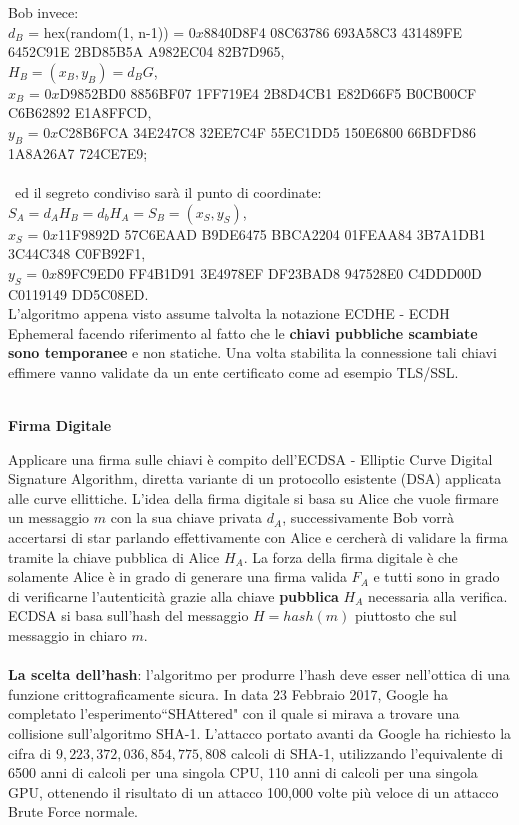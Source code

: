 \documentclass[a4paper,12pt]{tesiinfo}
\begin{document}
Bob invece:\\
$d_B$ = hex(random(1, n-1)) = $0x$8840D8F4 08C63786 693A58C3 431489FE 6452C91E 2BD85B5A A982EC04 82B7D965,\\
$H_B = (x_B, y_B) = d_BG$,\\
$x_B$ = $0x$D9852BD0 8856BF07 1FF719E4 2B8D4CB1 E82D66F5 B0CB00CF C6B62892 E1A8FFCD,\\
$y_B$ = $0x$C28B6FCA 34E247C8 32EE7C4F 55EC1DD5 150E6800 66BDFD86 1A8A26A7 724CE7E9;\\
\\\
ed il segreto condiviso sar\`a il punto di coordinate:\\
$S_A = d_AH_B = d_bH_A = S_B = (x_S, y_S)$,\\
$x_S$ = $0x$11F9892D 57C6EAAD B9DE6475 BBCA2204 01FEAA84 3B7A1DB1 3C44C348 C0FB92F1,\\
$y_S$ = $0x$89FC9ED0 FF4B1D91 3E4978EF DF23BAD8 947528E0 C4DDD00D C0119149 DD5C08ED.
\\
L'algoritmo appena visto assume talvolta la notazione ECDHE - ECDH Ephemeral facendo riferimento al fatto che le \textbf{chiavi pubbliche scambiate sono temporanee} e non statiche. Una volta stabilita la connessione tali chiavi effimere vanno validate da un ente certificato come ad esempio TLS/SSL.
\\
\\
\begin{center}
  \textbf{Firma Digitale}
\end{center}
Applicare una firma sulle chiavi \`e compito dell'ECDSA - Elliptic Curve Digital Signature Algorithm, diretta variante di un protocollo esistente (DSA) applicata alle curve ellittiche. L'idea della firma digitale si basa su Alice che vuole firmare un messaggio $m$ con la sua chiave privata $d_A$, successivamente Bob vorr\`a accertarsi di star parlando effettivamente con Alice e cercher\`a di validare la firma tramite la chiave pubblica di Alice $H_A$. La forza della firma digitale \`e che solamente Alice \`e in grado di generare una firma valida $F_A$ e tutti sono in grado di verificarne l'autenticit\`a grazie alla chiave \textbf{pubblica} $H_A$ necessaria alla verifica.
\\
ECDSA si basa sull'hash del messaggio $H = hash(m)$ piuttosto che sul messaggio in chiaro $m$.
\\
\\
\textbf{La scelta dell'hash}: l'algoritmo per produrre l'hash deve esser nell'ottica di una funzione crittograficamente sicura. In data 23 Febbraio 2017, Google ha completato l'esperimento``SHAttered" con il quale si mirava a trovare una collisione sull'algoritmo SHA-1. L'attacco portato avanti da Google ha richiesto la cifra di $9,223,372,036,854,775,808$ calcoli di SHA-1, utilizzando l'equivalente di 6500 anni di calcoli per una singola CPU, 110 anni di calcoli per una singola GPU, ottenendo il risultato di un attacco 100,000 volte pi\`u veloce di un attacco Brute Force normale.
\end{document}
